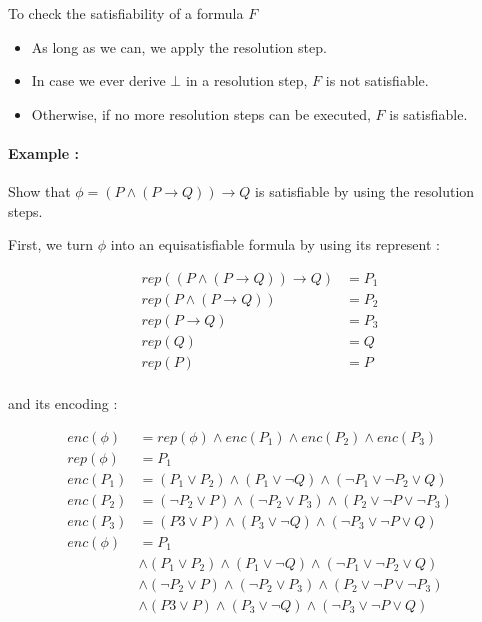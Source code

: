 \documentclass[a4paper,11pt]{report}
\begin{document}
To check the satisfiability of a formula $F$
\begin{itemize}
\item As long as we can, we apply the resolution step.
\item In case we ever derive $\bot$ in a resolution step, $F$ is not satisfiable.
\item Otherwise, if no more resolution steps can be executed, $F$ is satisfiable.
\end{itemize}

\paragraph{Example :} Show that $\phi = (P \wedge (P \to Q)) \to Q$ is satisfiable by
using the resolution steps.

First, we turn $\phi$ into an equisatisfiable formula by using its represent :

\begin{align*}
  rep((P \wedge (P \to Q)) \to Q) &= P_1 \\
  rep(P \wedge (P \to Q)) &= P_2 \\
  rep(P \to Q) &= P_3 \\
  rep(Q) &= Q \\
  rep(P) &= P \\
\end{align*}

and its encoding :

\begin{align*}
  enc(\phi) &= rep(\phi) \wedge enc(P_1) \wedge enc(P_2) \wedge enc(P_3) \\
  rep(\phi) &= P_1 \\
  enc(P_1) &= (P_1 \vee P_2) \wedge (P_1 \vee \neg Q) \wedge (\neg P_1 \vee \neg P_2 \vee Q)\\
  enc(P_2) &= (\neg P_2 \vee P) \wedge (\neg P_2 \vee P_3) \wedge (P_2 \vee \neg P \vee \neg P_3)\\
  enc(P_3) &= (P3 \vee P) \wedge (P_3 \vee \neg Q) \wedge (\neg P_3 \vee \neg P \vee Q)\\
  enc(\phi) &= P_1 \\
            & \wedge (P_1 \vee P_2) \wedge (P_1 \vee \neg Q) \wedge (\neg P_1 \vee \neg P_2 \vee Q) \\
            & \wedge (\neg P_2 \vee P) \wedge (\neg P_2 \vee P_3) \wedge (P_2 \vee \neg P \vee \neg P_3) \\
            & \wedge (P3 \vee P) \wedge (P_3 \vee \neg Q) \wedge (\neg P_3 \vee \neg P \vee Q)
\end{align*}
\end{document}
